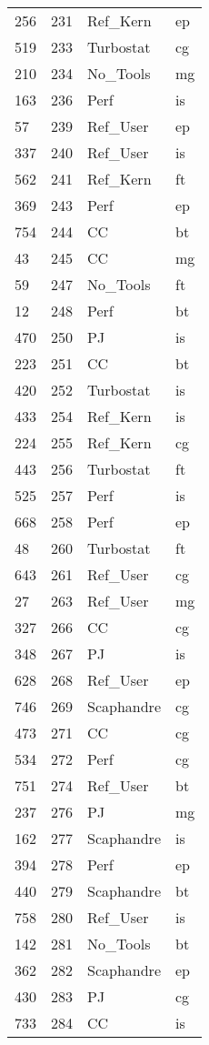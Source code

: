 \begin{tabular}{lrll}
256 & 231 & Ref_Kern & ep \\
519 & 233 & Turbostat & cg \\
210 & 234 & No_Tools & mg \\
163 & 236 & Perf & is \\
57 & 239 & Ref_User & ep \\
337 & 240 & Ref_User & is \\
562 & 241 & Ref_Kern & ft \\
369 & 243 & Perf & ep \\
754 & 244 & CC & bt \\
43 & 245 & CC & mg \\
59 & 247 & No_Tools & ft \\
12 & 248 & Perf & bt \\
470 & 250 & PJ & is \\
223 & 251 & CC & bt \\
420 & 252 & Turbostat & is \\
433 & 254 & Ref_Kern & is \\
224 & 255 & Ref_Kern & cg \\
443 & 256 & Turbostat & ft \\
525 & 257 & Perf & is \\
668 & 258 & Perf & ep \\
48 & 260 & Turbostat & ft \\
643 & 261 & Ref_User & cg \\
27 & 263 & Ref_User & mg \\
327 & 266 & CC & cg \\
348 & 267 & PJ & is \\
628 & 268 & Ref_User & ep \\
746 & 269 & Scaphandre & cg \\
473 & 271 & CC & cg \\
534 & 272 & Perf & cg \\
751 & 274 & Ref_User & bt \\
237 & 276 & PJ & mg \\
162 & 277 & Scaphandre & is \\
394 & 278 & Perf & ep \\
440 & 279 & Scaphandre & bt \\
758 & 280 & Ref_User & is \\
142 & 281 & No_Tools & bt \\
362 & 282 & Scaphandre & ep \\
430 & 283 & PJ & cg \\
733 & 284 & CC & is \\

\end{tabular}
